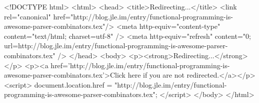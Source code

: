<!DOCTYPE html>
<html>
<head>
<title>Redirecting...</title>
<link rel="canonical" href="http://blog.jle.im/entry/functional-programming-is-awesome-parser-combinators.tex"/>
<meta http-equiv="content-type" content="text/html; charset=utf-8" />
<meta http-equiv="refresh" content="0; url=http://blog.jle.im/entry/functional-programming-is-awesome-parser-combinators.tex" />
</head>
<body>
  <p><strong>Redirecting...</strong></p>
  <p><a href='http://blog.jle.im/entry/functional-programming-is-awesome-parser-combinators.tex'>Click here if you are not redirected.</a></p>
  <script>
    document.location.href = "http://blog.jle.im/entry/functional-programming-is-awesome-parser-combinators.tex";
  </script>
</body>
</html>
